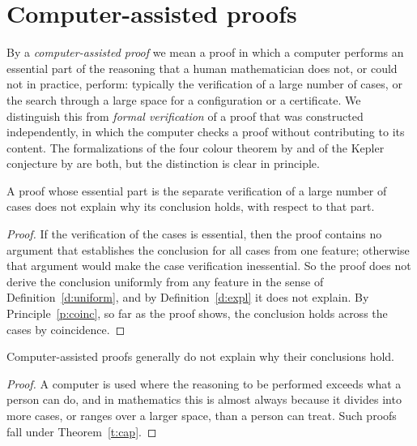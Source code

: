 \documentclass{situationist-preprint}
\begin{document}
\section{Computer-assisted proofs}

By a \emph{computer-assisted proof} we mean a proof in which a computer performs an essential part of the reasoning that a human mathematician does not, or could not in practice, perform: typically the verification of a large number of cases, or the search through a large space for a configuration or a certificate. We distinguish this from \emph{formal verification} of a proof that was constructed independently, in which the computer checks a proof without contributing to its content. The formalizations of the four colour theorem by \citet{Gonthier2008} and of the Kepler conjecture by \citet{HalesEtAl2017} are both, but the distinction is clear in principle.

\begin{theorem}\label{t:cap}
A proof whose essential part is the separate verification of a large number of cases does not explain why its conclusion holds, with respect to that part.
\end{theorem}

\begin{proof}
If the verification of the cases is essential, then the proof contains no argument that establishes the conclusion for all cases from one feature; otherwise that argument would make the case verification inessential. So the proof does not derive the conclusion uniformly from any feature in the sense of Definition~\ref{d:uniform}, and by Definition~\ref{d:expl} it does not explain. By Principle~\ref{p:coinc}, so far as the proof shows, the conclusion holds across the cases by coincidence.
\end{proof}

\begin{corollary}\label{c:cap}
Computer-assisted proofs generally do not explain why their conclusions hold.
\end{corollary}

\begin{proof}
A computer is used where the reasoning to be performed exceeds what a person can do, and in mathematics this is almost always because it divides into more cases, or ranges over a larger space, than a person can treat. Such proofs fall under Theorem~\ref{t:cap}.
\end{proof}
\end{document}

